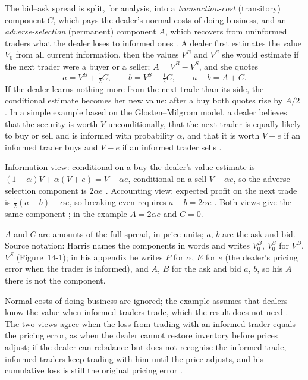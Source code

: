 \begin{qfresult}\label{res:adverse-selection-spread-component}
 The bid--ask spread is split, for analysis, into a \emph{transaction-cost} (transitory) component $C$, which pays the dealer's normal costs of doing business, and an \emph{adverse-selection} (permanent) component $A$, which recovers from uninformed traders what the dealer loses to informed ones \citep[chap.~``Bid/Ask Spreads'', pp.~298--299]{alpha-harris}. A dealer first estimates the value $V_0$ from all current information, then the values $V^B$ and $V^S$ she would estimate if the next trader were a buyer or a seller; $A=V^B-V^S$, and she quotes \citep[same chap., Figure~14-1, p.~301]{alpha-harris}
\[ a=V^B+\tfrac12C, \qquad b=V^S-\tfrac12C, \qquad a-b=A+C. \]
If the dealer learns nothing more from the next trade than its side, the conditional estimate becomes her new value: after a buy both quotes rise by $A/2$ \citep[same chap., Figure~14-2, pp.~301--302]{alpha-harris}. In a simple example based on the Glosten--Milgrom model, a dealer believes that the security is worth $V$ unconditionally, that the next trader is equally likely to buy or sell and is informed with probability $\alpha$, and that it is worth $V+e$ if an informed trader buys and $V-e$ if an informed trader sells \citep[chap.~``Bid/Ask Spreads'', p.~320]{alpha-harris}.

Information view: conditional on a buy the dealer's value estimate is $(1-\alpha)V+\alpha(V+e)=V+\alpha e$, conditional on a sell $V-\alpha e$, so the adverse-selection component is $2\alpha e$ \citep[same chap., p.~320]{alpha-harris}. Accounting view: expected profit on the next trade is $\tfrac12(a-b)-\alpha e$, so breaking even requires $a-b=2\alpha e$ \citep[same chap., pp.~320--321]{alpha-harris}. Both views give the same component \citep[same chap., p.~300]{alpha-harris}; in the example $A=2\alpha e$ and $C=0$.

 $A$ and $C$ are amounts of the full spread, in price units; $a$, $b$ are the ask and bid. Source notation: Harris names the components in words and writes $V_0^B$, $V_0^S$ for $V^B$, $V^S$ (Figure~14-1); in his appendix he writes $P$ for $\alpha$, $E$ for $e$ (the dealer's pricing error when the trader is informed), and $A$, $B$ for the ask and bid $a$, $b$, so his $A$ there is not the component.

 Normal costs of doing business are ignored; the example assumes that dealers know the value when informed traders trade, which the result does not need \citep[same chap., pp.~300 and~320]{alpha-harris}. The two views agree when the loss from trading with an informed trader equals the pricing error, as when the dealer cannot restore inventory before prices adjust; if the dealer can rebalance but does not recognise the informed trade, informed traders keep trading with him until the price adjusts, and his cumulative loss is still the original pricing error \citep[same chap., p.~302]{alpha-harris}.


\end{qfresult}
